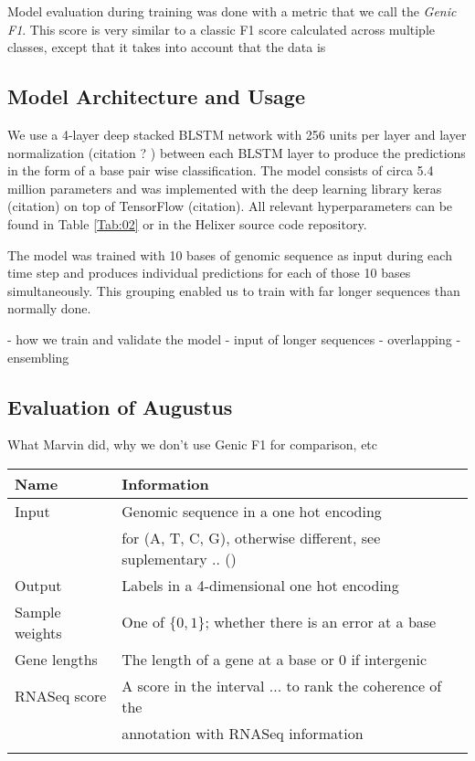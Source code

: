 \documentclass{bioinfo}
\begin{document}
\begin{methods}
Model evaluation during training was done with a metric that we call the {\it Genic F1}. This score is very similar to a classic F1 score calculated across multiple classes, except that it takes into account that the data is 

\subsection{Model Architecture and Usage}
	We use a 4-layer deep stacked BLSTM network with 256 units per layer and layer normalization (citation ? ) between each BLSTM layer to produce the predictions in the form of a base pair wise classification. The model consists of circa 5.4 million parameters and was implemented with the deep learning library keras (citation) on top of TensorFlow (citation). All relevant hyperparameters can be found in Table \ref{Tab:02} or in the Helixer source code repository. 
	
The model was trained with 10 bases of genomic sequence as input during each time step and produces individual predictions for each of those 10 bases simultaneously. This grouping enabled us to train with far longer sequences than normally done.

- how we train and validate the model
- input of longer sequences
- overlapping
- ensembling

\subsection{Evaluation of Augustus}
What Marvin did, why we don't use Genic F1 for comparison, etc


\begin{table}[!t]
 {
\begin{tabular}{@{}ll@{}}
\toprule Name & Information \\
\midrule
Input & Genomic sequence in a one hot encoding\\
	  & for (A, T, C, G), otherwise different, see suplementary .. ()\\
Output & Labels in a 4-dimensional one hot encoding \\
Sample weights & One of $\{0,1\}$; whether there is an error at a base\\
Gene lengths & The length of a gene at a base or 0 if intergenic \\
RNASeq score & A score in the interval $...$ to rank the coherence of the \\
		     & annotation with RNASeq information \\
\botrule
\end{tabular}}{}
\end{table}


\end{methods}
\end{document}
